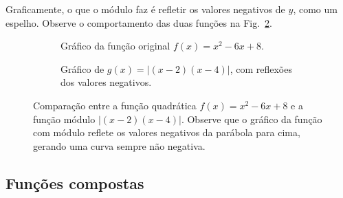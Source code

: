 \documentclass[12pt,openright,twoside,a4paper]{article}
\theoremstyle{definition}
\begin{document}
	Graficamente, o que o módulo faz é refletir os valores negativos de $y$, como um espelho. Observe o comportamento das duas funções na Fig.~\ref{fig:modulo}.
	
	\begin{figure}[h]
		\centering
		
		\begin{subfigure}[t]{0.48\textwidth}
			\centering
			\caption{Gráfico da função original \( f(x) = x^2 - 6x + 8 \).}
			\label{fig:quadratica}
		\end{subfigure}
		\hfill
		\begin{subfigure}[t]{0.48\textwidth}
			\centering
			\caption{Gráfico de \( g(x) = |(x-2)(x-4)| \), com reflexões dos valores negativos.}
			\label{fig:modulo}
		\end{subfigure}
		
		\caption{Comparação entre a função quadrática \( f(x) = x^2 - 6x + 8 \) e a função módulo \( |(x-2)(x-4)| \). Observe que o gráfico da função com módulo reflete os valores negativos da parábola para cima, gerando uma curva sempre não negativa.}
		\label{fig:comparacao-funcao-modulo}
	\end{figure}
	
	
	\subsection{Funções compostas}
	
\end{document}
